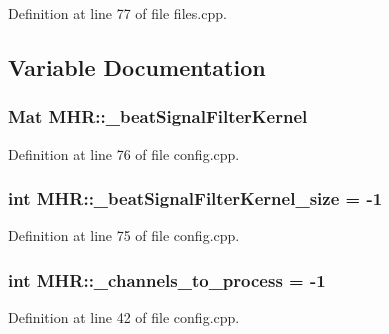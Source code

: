 Definition at line 77 of file files.\+cpp.



\subsection{Variable Documentation}
\hypertarget{namespace_m_h_r_ab83e011c36b7688dab5ef024c8894300}{
\subsubsection[{\+\_\+beat\+Signal\+Filter\+Kernel}]{\setlength{\rightskip}{0pt plus 5cm}Mat M\+H\+R\+::\+\_\+beat\+Signal\+Filter\+Kernel}}\label{namespace_m_h_r_ab83e011c36b7688dab5ef024c8894300}


Definition at line 76 of file config.\+cpp.

\hypertarget{namespace_m_h_r_a5d907d8ef896004dce9f0fd1d47b77e7}{
\subsubsection[{\+\_\+beat\+Signal\+Filter\+Kernel\+\_\+size}]{\setlength{\rightskip}{0pt plus 5cm}int M\+H\+R\+::\+\_\+beat\+Signal\+Filter\+Kernel\+\_\+size = -\/1}}\label{namespace_m_h_r_a5d907d8ef896004dce9f0fd1d47b77e7}


Definition at line 75 of file config.\+cpp.

\hypertarget{namespace_m_h_r_a02a81ed541f6536b1632d65c8f2ad0d3}{
\subsubsection[{\+\_\+channels\+\_\+to\+\_\+process}]{\setlength{\rightskip}{0pt plus 5cm}int M\+H\+R\+::\+\_\+channels\+\_\+to\+\_\+process = -\/1}}\label{namespace_m_h_r_a02a81ed541f6536b1632d65c8f2ad0d3}


Definition at line 42 of file config.\+cpp.

